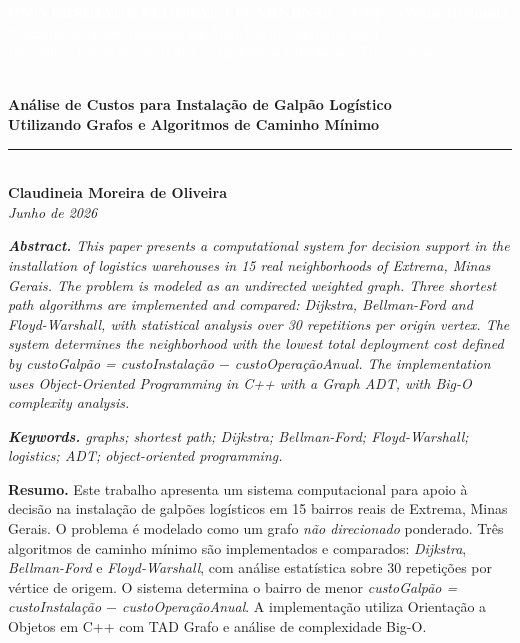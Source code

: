 \documentclass[12pt, a4paper]{article}
\begin{document}
\begin{center}
    \colorbox{azulescuro}{\parbox{\textwidth}{\centering\vspace{0.3cm}
    {\large \textcolor{white}{\textbf{UNIVERSIDADE FEDERAL FLUMINENSE -- UFF -- Volta Redonda}}} \\[0.2cm]
    {\normalsize \textcolor{white}{Programa de Pós-Graduação em Modelagem Computacional}} \\[0.1cm]
    {\normalsize \textcolor{white}{Disciplina: Estrutura de Dados e Algoritmos \quad | \quad Professor: Thiago Neves}}
    \vspace{0.3cm}}} \\[0.4cm]
    {\LARGE \textbf{\textcolor{azulescuro}{Análise de Custos para Instalação de Galpão Logístico\\
    Utilizando Grafos e Algoritmos de Caminho Mínimo}}} \\[0.3cm]
    \textcolor{azulescuro}{\rule{\linewidth}{1.5pt}} \\[0.2cm]
    {\normalsize \textbf{Claudineia Moreira de Oliveira}} \\[0.1cm]
    {\normalsize \textit{Junho de 2026}}
\end{center}

\vspace{0.3cm}

\noindent\textit{\textbf{Abstract.} This paper presents a computational system for decision support in the installation of logistics warehouses in 15 real neighborhoods of Extrema, Minas Gerais. The problem is modeled as an undirected weighted graph. Three shortest path algorithms are implemented and compared: Dijkstra, Bellman-Ford and Floyd-Warshall, with statistical analysis over 30 repetitions per origin vertex. The system determines the neighborhood with the lowest total deployment cost defined by \textit{custoGalp\~ao = custoInstala\c{c}\~ao $-$ custoOpera\c{c}\~aoAnual}. The implementation uses Object-Oriented Programming in C++ with a Graph ADT, with Big-O complexity analysis.}

\vspace{0.2cm}
\noindent\textit{\textbf{Keywords.} graphs; shortest path; Dijkstra; Bellman-Ford; Floyd-Warshall; logistics; ADT; object-oriented programming.}

\vspace{0.3cm}

\noindent\textbf{Resumo.} Este trabalho apresenta um sistema computacional para apoio à decisão na instalação de galpões logísticos em 15 bairros reais de Extrema, Minas Gerais. O problema é modelado como um grafo \textit{não direcionado} ponderado. Três algoritmos de caminho mínimo são implementados e comparados: \textit{Dijkstra}, \textit{Bellman-Ford} e \textit{Floyd-Warshall}, com análise estatística sobre 30 repetições por vértice de origem. O sistema determina o bairro de menor \textit{custoGalp\~ao = custoInstala\c{c}\~ao $-$ custoOpera\c{c}\~aoAnual}. A implementação utiliza Orientação a Objetos em C++ com TAD Grafo e análise de complexidade Big-O.
\end{document}
